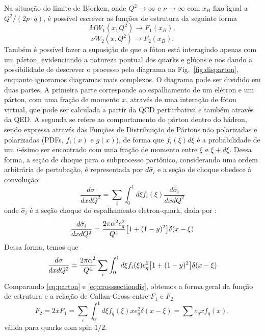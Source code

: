 Na situação do limite de Bjorken, onde \( Q^2 \rightarrow \infty \) e \( \nu \rightarrow \infty \) com \( x_B \) fixo igual a \( Q^2/(2p \cdot q) \), é possível escrever as funções de estrutura da seguinte forma 
\begin{equation}
    MW_1 (x, Q^2)\rightarrow F_1(x_B),
\end{equation}
\begin{equation}
    \nu W_2(x, Q^2) \rightarrow F_2(x_B).
\end{equation}
Também é possível fazer a suposição de que o fóton está interagindo apenas com um párton, evidenciando a natureza pontual dos quarks e glúons e nos dando a possibilidade de descrever o processo pelo diagrama na Fig.~\ref{fig:disparton}, enquanto ignoramos diagramas mais complexos. O diagrama pode ser dividido em duas partes. A primeira parte corresponde ao espalhamento de um elétron e um párton, com uma fração de momento \( x \), através  de uma interação de fóton virtual, que pode ser calculada a partir da  QCD perturbativa e também através da QED. A segunda se refere ao comportamento do párton dentro do hádron, sendo expressa através das Funções de Distribuição de Pártons não polarizadas e polarizadas (PDFs, \( f_i(x) \) e \( g(x) \)), de forma que  $f_i(\xi) d\xi$ é a probabilidade de um $i$-ésimo ser encontrado com uma fração de momento entre $\xi$ e $\xi + d\xi$. Dessa forma, a seção de choque para o subprocesso partônico, considerando uma ordem arbitrária de pertubação, é representada por $d\hat{\sigma}_i$  e a seção de choque obedece à convolução:
\begin{equation}
	\frac{d\sigma}{dxdQ^2}  = \sum_i \int^{1}_{0} d\xi f_i(\xi) \frac{d\hat{\sigma}_i}{dxdQ^2} 
\end{equation}
onde $\hat{\sigma}_i$ é a seção choque do espalhamento eletron-quark, dada por :
\begin{equation}
	 \frac{d\hat{\sigma}_i}{dxdQ^2}  = \frac{2\pi\alpha^2e_q^2}{Q^4}\qty[1 + (1-y)^2]\delta(x-\xi)
\end{equation}
Dessa forma, temos que 
\begin{equation}
    \frac{d\sigma}{dxdQ^2}  = \frac{2\pi\alpha^2}{Q^4}\sum_i \int^{1}_{0} d\xi f_i(\xi) e_q^2  \qty[1 + (1-y)^2]\delta(x-\xi)
    \label{eq:parton}
\end{equation}
Comparando \eqref{eq:parton} e \eqref{eq:crosssectiondis}, obtemos a forma geral da função de estrutura e a relação de Callan-Gross entre $F_1$ e $F_2$
\begin{equation}
    F_2 = 2xF_1 = \sum_i \int^1_0 d\xi f_q(\xi) x e_q^2 \delta(x-\xi) = \sum e_q x f_q(x),
    \label{eq:funcaoestruturapdfs}
\end{equation}
 válida para quarks com spin $1/2$.
 

